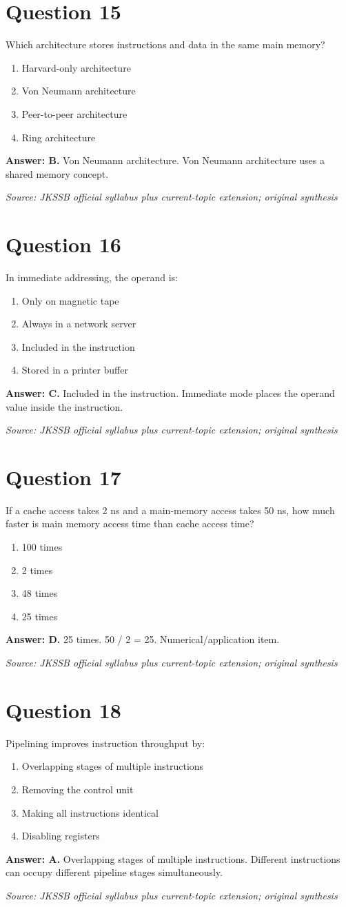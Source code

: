 \documentclass[11pt,a4paper]{book}
\newcommand{\source}[1]{\par\smallskip\textit{Source: #1}}
\newcommand{\answer}[2]{\par\textbf{Answer: #1.} #2}
\begin{document}
\section*{Question 15}
Which architecture stores instructions and data in the same main memory?
\begin{enumerate}[label=\Alph*.]
\item Harvard-only architecture
\item Von Neumann architecture
\item Peer-to-peer architecture
\item Ring architecture
\end{enumerate}
\answer{B}{Von Neumann architecture. Von Neumann architecture uses a shared memory concept.}
\source{JKSSB official syllabus plus current-topic extension; original synthesis}
\section*{Question 16}
In immediate addressing, the operand is:
\begin{enumerate}[label=\Alph*.]
\item Only on magnetic tape
\item Always in a network server
\item Included in the instruction
\item Stored in a printer buffer
\end{enumerate}
\answer{C}{Included in the instruction. Immediate mode places the operand value inside the instruction.}
\source{JKSSB official syllabus plus current-topic extension; original synthesis}
\section*{Question 17}
If a cache access takes 2 ns and a main-memory access takes 50 ns, how much faster is main memory access time than cache access time?
\begin{enumerate}[label=\Alph*.]
\item 100 times
\item 2 times
\item 48 times
\item 25 times
\end{enumerate}
\answer{D}{25 times. 50 / 2 = 25. Numerical/application item.}
\source{JKSSB official syllabus plus current-topic extension; original synthesis}
\section*{Question 18}
Pipelining improves instruction throughput by:
\begin{enumerate}[label=\Alph*.]
\item Overlapping stages of multiple instructions
\item Removing the control unit
\item Making all instructions identical
\item Disabling registers
\end{enumerate}
\answer{A}{Overlapping stages of multiple instructions. Different instructions can occupy different pipeline stages simultaneously.}
\source{JKSSB official syllabus plus current-topic extension; original synthesis}
\end{document}
